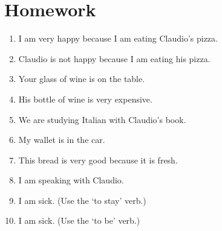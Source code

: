 \section{Homework} \label{0221-Homework}
\begin{enumerate}
    \item I am very happy because I am eating Claudio's pizza. \\
    
    \item Claudio is not happy because I am eating his pizza. \\
     
    \item Your glass of wine is on the table. \\
    
    \item His bottle of wine is very expensive. \\
    
    \item We are studying Italian with Claudio's book. \\
    
    \item My wallet is in the car. \\
    
    \item This bread is very good because it is fresh. \\
    
    \item I am speaking with Claudio. \\
    
    \item I am sick. (Use the `to stay' verb.) \\
    
    \item I am sick. (Use the `to be' verb.) \\
\end{enumerate}

